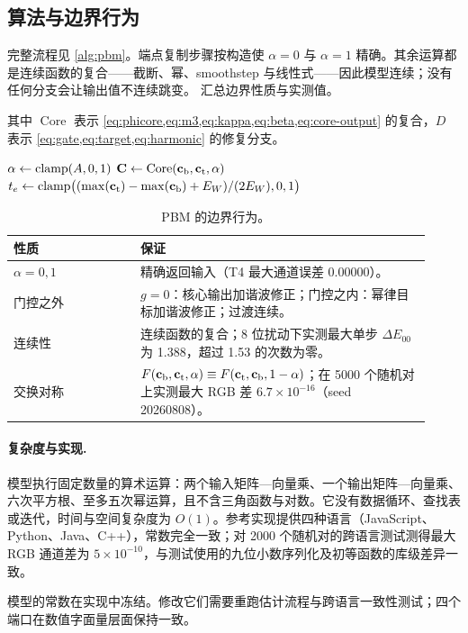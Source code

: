 \subsection{算法与边界行为}
\label{sec:algorithm}

完整流程见 \cref{alg:pbm}。端点复制步骤按构造使 $\alpha=0$ 与 $\alpha=1$ 精确。其余运算都是连续函数的复合——截断、幂、smoothstep 与线性式——因此模型连续；没有任何分支会让输出值不连续跳变。 汇总边界性质与实测值。

其中 $\operatorname{Core}$ 表示 \cref{eq:phicore,eq:m3,eq:kappa,eq:beta,eq:core-output} 的复合，$D$ 表示 \cref{eq:gate,eq:target,eq:harmonic} 的修复分支。

\begin{algorithm}[t]
\caption{PBM 混色.}
\label{alg:pbm}
$\alpha\gets\operatorname{clamp}(A,0,1)$\;
$\mathbf{C}\gets\operatorname{Core}(\mathbf{c}_{\mathrm{b}},\mathbf{c}_{\mathrm{t}},\alpha)$\;
$t_{e}\gets\operatorname{clamp}\bigl((\max(\mathbf{c}_{\mathrm{t}})-\max(\mathbf{c}_{\mathrm{b}})+E_{W})/(2E_{W}),0,1\bigr)$\;
\;
\end{algorithm}

\begin{table}[t]
\centering
\small
\caption{PBM 的边界行为。}
\label{tab:boundary}
\begin{tabular}{p{0.28\linewidth}p{0.64\linewidth}}
\toprule
性质 & 保证 \\
\midrule
$\alpha=0,1$ & 精确返回输入（T4 最大通道误差 0.00000）。 \\
门控之外 & $g=0$：核心输出加谐波修正；门控之内：幂律目标加谐波修正；过渡连续。 \\
连续性 & 连续函数的复合；8 位扰动下实测最大单步 $\Delta E_{00}$ 为 1.388，超过 1.53 的次数为零。 \\
交换对称 & $F(\mathbf{c}_{\mathrm{b}},\mathbf{c}_{\mathrm{t}},\alpha)\equiv F(\mathbf{c}_{\mathrm{t}},\mathbf{c}_{\mathrm{b}},1-\alpha)$；在 5000 个随机对上实测最大 RGB 差 $6.7\times10^{-16}$（seed 20260808）。 \\
\bottomrule
\end{tabular}
\end{table}

\paragraph{复杂度与实现.}
模型执行固定数量的算术运算：两个输入矩阵—向量乘、一个输出矩阵—向量乘、六次平方根、至多五次幂运算，且不含三角函数与对数。它没有数据循环、查找表或迭代，时间与空间复杂度为 $O(1)$。参考实现提供四种语言（JavaScript、Python、Java、C++），常数完全一致；对 2000 个随机对的跨语言测试测得最大 RGB 通道差为 $5\times10^{-10}$，与测试使用的九位小数序列化及初等函数的库级差异一致。

模型的常数在实现中冻结。修改它们需要重跑估计流程与跨语言一致性测试；四个端口在数值字面量层面保持一致。
